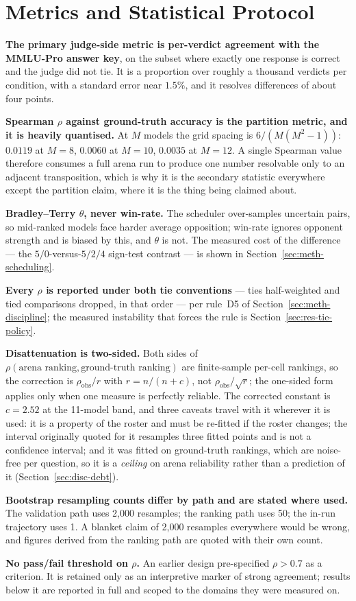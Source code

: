 \section{Metrics and Statistical Protocol}\label{sec:exp-metrics}

\textbf{The primary judge-side metric is per-verdict agreement with the
MMLU-Pro answer key}, on the subset where exactly one response is
correct and the judge did not tie. It is a proportion over roughly a
thousand verdicts per condition, with a standard error near $1.5\%$,
and it resolves differences of about four points.

\textbf{Spearman $\rho$ against ground-truth accuracy is the partition
metric, and it is heavily quantised.} At $M$ models the grid spacing is
$6/(M(M^2-1))$: $0.0119$ at $M = 8$, $0.0060$ at $M = 10$, $0.0035$ at
$M = 12$. A single Spearman value therefore consumes a full arena run to
produce one number resolvable only to an adjacent transposition, which
is why it is the secondary statistic everywhere except the partition
claim, where it is the thing being claimed about.

\textbf{Bradley--Terry $\theta$, never win-rate.} The scheduler
over-samples uncertain pairs, so mid-ranked models face harder average
opposition; win-rate ignores opponent strength and is biased by this,
and $\theta$ is not. The measured cost of the difference --- the
$5/0$-versus-$5/2/4$ sign-test contrast --- is shown in
Section~\ref{sec:meth-scheduling}.

\textbf{Every $\rho$ is reported under both tie conventions} ---
ties half-weighted and tied comparisons dropped, in that order --- per
rule~D5 of Section~\ref{sec:meth-discipline}; the measured instability
that forces the rule is Section~\ref{sec:res-tie-policy}.

\textbf{Disattenuation is two-sided.} Both sides of
$\rho(\text{arena ranking}, \text{ground-truth ranking})$ are
finite-sample per-cell rankings, so the correction is $\rho_{\text{obs}}
/ r$ with $r = n/(n+c)$, not $\rho_{\text{obs}} / \sqrt{r}$; the
one-sided form applies only when one measure is perfectly reliable. The
corrected constant is $c = 2.52$ at the 11-model band, and three
caveats travel with it wherever it is used: it is a property of the
roster and must be re-fitted if the roster changes; the interval
originally quoted for it resamples three fitted points and is not a
confidence interval; and it was fitted on ground-truth rankings, which
are noise-free per question, so it is a \emph{ceiling} on arena
reliability rather than a prediction of it
(Section~\ref{sec:disc-debt}).

\textbf{Bootstrap resampling counts differ by path and are stated where
used.} The validation path uses 2{,}000 resamples; the ranking path
uses 50; the in-run trajectory uses 1. A blanket claim of 2{,}000
resamples everywhere would be wrong, and figures derived from the
ranking path are quoted with their own count.

\textbf{No pass/fail threshold on $\rho$.} An earlier design
pre-specified $\rho > 0.7$ as a criterion. It is retained only as an
interpretive marker of strong agreement; results below it are reported
in full and scoped to the domains they were measured on.
